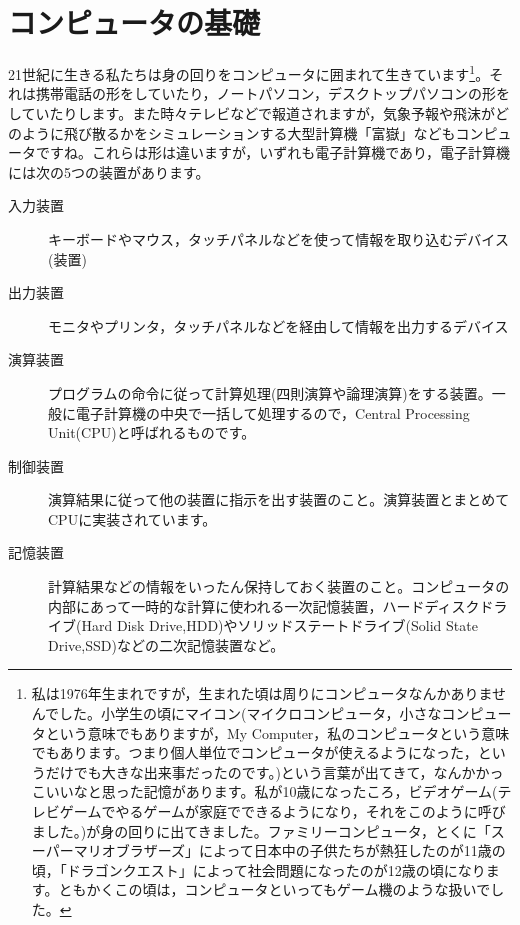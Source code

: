 \documentclass{ltjsbook}
\begin{document}
\section{コンピュータの基礎}
21世紀に生きる私たちは身の回りをコンピュータに囲まれて生きています\footnote{私は1976年生まれですが，生まれた頃は周りにコンピュータなんかありませんでした。小学生の頃にマイコン(マイクロコンピュータ，小さなコンピュータという意味でもありますが，My Computer，私のコンピュータという意味でもあります。つまり個人単位でコンピュータが使えるようになった，というだけでも大きな出来事だったのです。)という言葉が出てきて，なんかかっこいいなと思った記憶があります。私が10歳になったころ，ビデオゲーム(テレビゲームでやるゲームが家庭でできるようになり，それをこのように呼びました。)が身の回りに出てきました。ファミリーコンピュータ，とくに「スーパーマリオブラザーズ」によって日本中の子供たちが熱狂したのが11歳の頃，「ドラゴンクエスト」によって社会問題になったのが12歳の頃になります。ともかくこの頃は，コンピュータといってもゲーム機のような扱いでした。}。それは携帯電話の形をしていたり，ノートパソコン，デスクトップパソコンの形をしていたりします。また時々テレビなどで報道されますが，気象予報や飛沫がどのように飛び散るかをシミュレーションする大型計算機「富嶽」などもコンピュータですね。これらは形は違いますが，いずれも電子計算機であり，電子計算機には次の5つの装置があります。
\begin{description}
    \item[入力装置] キーボードやマウス，タッチパネルなどを使って情報を取り込むデバイス(装置)
    \item[出力装置] モニタやプリンタ，タッチパネルなどを経由して情報を出力するデバイス
    \item[演算装置] プログラムの命令に従って計算処理(四則演算や論理演算)をする装置。一般に電子計算機の中央で一括して処理するので，Central Processing Unit(CPU)と呼ばれるものです。
    \item[制御装置] 演算結果に従って他の装置に指示を出す装置のこと。演算装置とまとめてCPUに実装されています。
    \item[記憶装置] 計算結果などの情報をいったん保持しておく装置のこと。コンピュータの内部にあって一時的な計算に使われる一次記憶装置，ハードディスクドライブ(Hard Disk Drive,HDD)やソリッドステートドライブ(Solid State Drive,SSD)などの二次記憶装置など。
\end{description}
\end{document}
